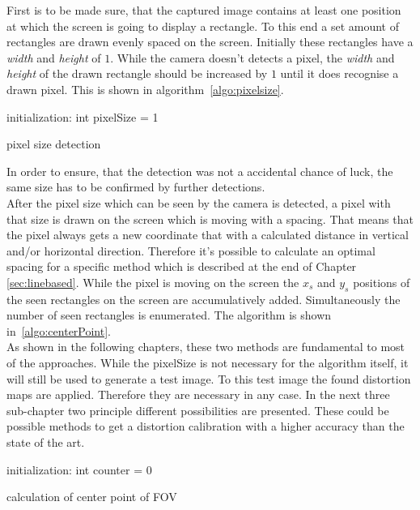 \documentclass[journal,final,a4paper,twoside]{PS}
\begin{document}
First is to be made sure, that the captured image contains at least one position at which the screen is going to display a rectangle. To this end a set amount of rectangles are drawn evenly spaced on the screen. Initially these rectangles have a \emph{width} and \emph{height} of $1$. While the camera doesn't detects a pixel, the \emph{width} and \emph{height} of the drawn rectangle should be increased by $1$ until it does recognise a drawn pixel. This is shown in algorithm~\ref{algo:pixelsize}.
\begin{algorithm}[h]
 initialization: int pixelSize = 1\;
 \caption{pixel size detection}
 \label{algo:pixelsize}
\end{algorithm} 
 In order to ensure, that the detection was not a accidental chance of luck, the same size has to be confirmed by further detections. \\
After the pixel size which can be seen by the camera is detected, a pixel with that size is drawn on the screen which is moving with a spacing. That means that the pixel always gets a new coordinate that with a calculated distance in vertical and/or horizontal  direction. Therefore it's possible to calculate an optimal spacing for a specific method which is described at the end of Chapter \ref{sec:linebased}. While the pixel is moving on the screen the $x_s$ and $y_s$ positions of the seen rectangles on the screen are accumulatively added. Simultaneously the number of seen rectangles is enumerated. The algorithm is shown in~\ref{algo:centerPoint}.\\
As shown in the following chapters, these two methods are fundamental to most of the approaches. While the pixelSize is not necessary for the algorithm itself, it will still be used to generate a test image. To this test image the found distortion maps are applied. Therefore they are necessary in any case. In the next three sub-chapter two principle different possibilities are presented. These could be possible methods to get a distortion calibration with a higher accuracy than the state of the art. 
 
\begin{algorithm}[h]
 initialization: int counter = 0\;
 \caption{calculation of center point of FOV}
 \label{algo:centerPoint}
\end{algorithm} 
\end{document}
